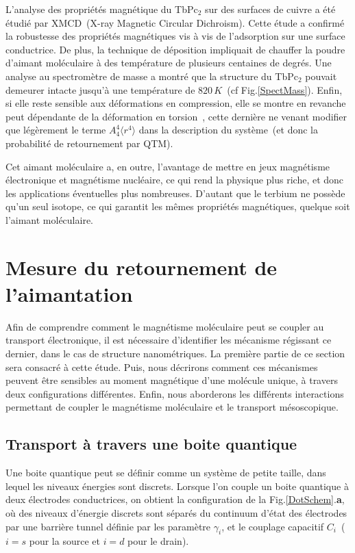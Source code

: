 L'analyse des propriétés magnétique du TbPc$_{2}$ sur des surfaces de cuivre a été étudié par XMCD~(X-ray Magnetic Circular Dichroism). Cette étude a confirmé la robustesse des propriétés magnétiques vis à vis de l'adsorption sur une surface conductrice. De plus, la technique de déposition impliquait de chauffer la poudre d'aimant moléculaire à des température de plusieurs centaines de degrés. Une analyse au spectromètre de masse a montré que la structure du TbPc$_{2}$ pouvait demeurer intacte jusqu'à une température de $820\,K$~(cf Fig.\ref{SpectMass}). Enfin, si elle reste sensible aux déformations en compression, elle se montre en revanche peut dépendante de la déformation en torsion~\cite{Sorace2011}, cette dernière ne venant modifier que légèrement le terme $A_4^4 \langle r^4 \rangle$ dans la description du système~(et donc la probabilité de retournement par QTM).

Cet aimant moléculaire a, en outre, l'avantage de mettre en jeux magnétisme électronique et magnétisme nucléaire, ce qui rend la physique plus riche, et donc les applications éventuelles plus nombreuses. D'autant que le terbium ne possède qu'un seul isotope, ce qui garantit les mêmes propriétés magnétiques, quelque soit l'aimant moléculaire.

\section{Mesure du retournement de l'aimantation}
Afin de comprendre comment le magnétisme moléculaire peut se coupler au transport électronique, il est nécessaire d'identifier les mécanisme régissant ce dernier, dans le cas de structure nanométriques. La première partie de ce section sera consacré à cette étude.
Puis, nous décrirons comment ces mécanismes peuvent \^etre sensibles au moment magnétique d'une molécule unique, à travers deux configurations différentes. Enfin, nous aborderons les différents interactions permettant de coupler le magnétisme moléculaire et le transport mésoscopique.

\subsection{Transport à travers une boite quantique}
Une boite quantique peut se définir comme un système de petite taille, dans lequel les niveaux énergies sont discrets. Lorsque l'on couple un boite quantique à deux électrodes conductrices, on obtient la configuration de la Fig.\ref{DotSchem}.\textbf{a}, où des niveaux d'énergie discrets sont séparés du continuum d'état des électrodes par une barrière tunnel définie par les paramètre $\gamma_i$, et le couplage capacitif $C_i$~($i=s$ pour la source et $i=d$ pour le drain).

